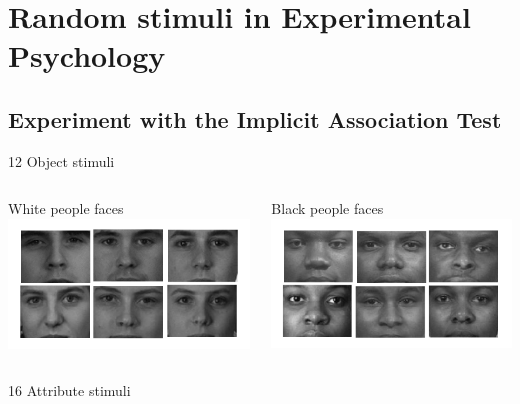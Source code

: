 \documentclass[compress]{beamer}
\begin{document}
\section{Random stimuli in Experimental Psychology}

\subsection{Experiment with the Implicit Association Test}
\begin{frame}

\small

	
	\begin{block}{12 Object stimuli}
	\begin{columns}
		\centering
			White people faces
		\includegraphics[width=\linewidth]{img/white.png}
		
		\centering
			Black people faces
		\includegraphics[width=\linewidth]{img/black.png}
	\end{columns}		
	\end{block}
	

	
	\begin{block}{16 Attribute stimuli}
		

\end{block}
\end{frame}
\end{document}
